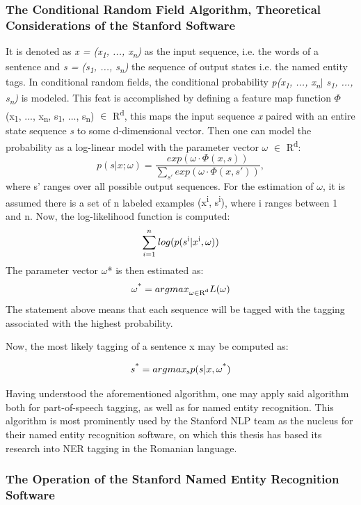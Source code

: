 \documentclass[12pt,a4paper]{article}
\begin{document}
\subsubsection{The Conditional Random Field Algorithm, Theoretical Considerations of the Stanford Software} 
\qquad \quad It is denoted as \textit{x = (x\textsubscript{1}, ..., x\textsubscript{n})} as the input sequence, i.e. the words of a sentence and \textit{ s = (s\textsubscript{1}, ..., s\textsubscript{n})} the sequence of output states i.e. the named entity tags. In conditional random fields, the conditional probability \textit{p(x\textsubscript{1}, ..., x\textsubscript{n}$|$ s\textsubscript{1}, ..., s\textsubscript{n})} is modeled. This feat is accomplished by defining a feature map function $\Phi$(x\textsubscript{1}, ..., x\textsubscript{n}, s\textsubscript{1}, ..., s\textsubscript{n}) $\in$ R\textsuperscript{d}, this maps the input sequence \textit{x} paired with an entire state sequence \textit{s} to some d-dimensional vector. Then one can model the probability as a log-linear model with the parameter vector $\omega$ $\in$ R\textsuperscript{d}: \[p(s|x; \omega) = \frac{exp(\omega \cdot \Phi(x, s))}{\sum_{s'}^{} exp(\omega \cdot \Phi(x, s'))},\] where s' ranges over all possible output sequences. For the estimation of $\omega$, it is assumed there is a set of n labeled examples {(x\textsuperscript{i}, s\textsuperscript{i})}, where i ranges between 1 and n. Now, the log-likelihood function is computed: 
\[\sum_{i=1}^{n} log( p(s\textsuperscript{i}|x\textsuperscript{i}, \omega))\]
The parameter vector $\omega$* is then estimated as:
\[\omega\textsuperscript{*} = argmax \textsubscript{$\omega$$\in$R\textsuperscript{d}} L(\omega)\]
The statement above means that each sequence will be tagged with the tagging associated with the highest probability. 

Now, the most likely tagging of a sentence x may be computed as:

\[s\textsuperscript{*} = argmax\textsubscript{s}p(s|x, \omega\textsuperscript{*})\]

\qquad Having understood the aforementioned algorithm, one may apply said algorithm both for part-of-speech tagging, as well as for named entity recognition. This algorithm is most prominently used by the Stanford NLP team as the nucleus for their named entity recognition software, on which this thesis has based its research into NER tagging in the Romanian language.
\subsubsection{The Operation of the Stanford Named Entity Recognition Software}
\end{document}
